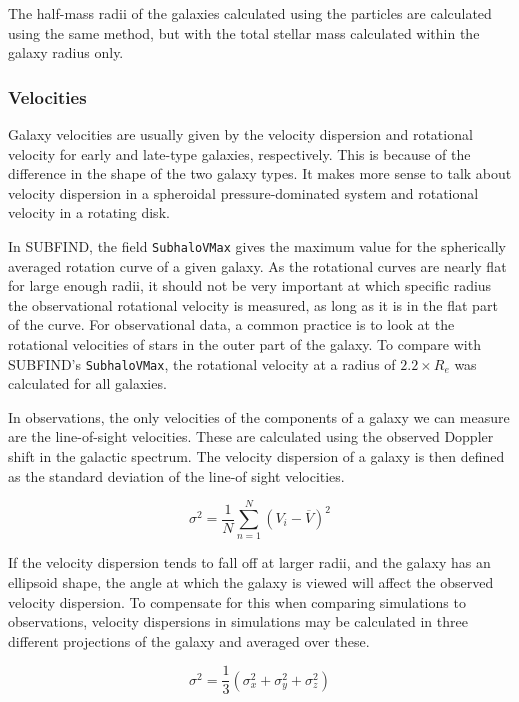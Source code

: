 The half-mass radii of the galaxies calculated using the particles are calculated using the same method, but with the total stellar mass calculated within the galaxy radius only.

\subsubsection{Velocities}

Galaxy velocities are usually given by the velocity dispersion and rotational velocity for early and late-type galaxies, respectively. This is because of the difference in the shape of the two galaxy types. It makes more sense to talk about velocity dispersion in a spheroidal pressure-dominated system and rotational velocity in a rotating disk.

In SUBFIND, the field \texttt{SubhaloVMax} gives the maximum value for the spherically averaged rotation curve of a given galaxy. As the rotational curves are nearly flat for large enough radii, it should not be very important at which specific radius the observational rotational velocity is measured, as long as it is in the flat part of the curve. For observational data, a common practice is to look at the rotational velocities of stars in the outer part of the galaxy. To compare with SUBFIND's \texttt{SubhaloVMax}, the rotational velocity at a radius of $2.2 \times R_e$ was calculated for all galaxies.


In observations, the only velocities of the components of a galaxy we can measure are the line-of-sight velocities. These are calculated using the observed Doppler shift in the galactic spectrum. The velocity dispersion of a galaxy is then defined as the standard deviation of the line-of sight velocities.

\begin{equation} \label{standard_dev}
    \sigma^{2} = \frac{1}{N} \sum_{n=1}^{N} (V_{i} - \overline{V})^2
\end{equation}

If the velocity dispersion tends to fall off at larger radii, and the galaxy has an ellipsoid shape, the angle at which the galaxy is viewed will affect the observed velocity dispersion. To compensate for this when comparing simulations to observations, velocity dispersions in simulations may be calculated in three different projections of the galaxy and averaged over these. 

\begin{equation} \label{sigma1}
    \sigma^{2} = \frac{1}{3}(\sigma_x^2 + \sigma_y^2 + \sigma_z^2)
\end{equation}

